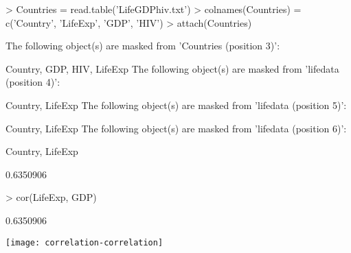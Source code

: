 \begin{Schunk}
\begin{Sinput}
> Countries = read.table('LifeGDPhiv.txt')
> colnames(Countries) = c('Country', 'LifeExp', 'GDP', 'HIV')
> attach(Countries)
\end{Sinput}
\begin{Soutput}
The following object(s) are masked from 'Countries (position 3)':

    Country, GDP, HIV, LifeExp
The following object(s) are masked from 'lifedata (position 4)':

    Country, LifeExp
The following object(s) are masked from 'lifedata (position 5)':

    Country, LifeExp
The following object(s) are masked from 'lifedata (position 6)':

    Country, LifeExp
\end{Soutput}
\begin{Soutput}
[1] 0.6350906
\end{Soutput}
\begin{Sinput}
> cor(LifeExp, GDP)
\end{Sinput}
\begin{Soutput}
[1] 0.6350906
\end{Soutput}
\end{Schunk}
\texttt{[image: correlation-correlation]}

